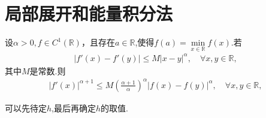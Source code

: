 \documentclass[../../main.tex]{subfiles}%
\begin{document}
\section{局部展开和能量积分法}

\begin{proposition}\label{proposition:g'(x)的Hölder连续相关结论}
设$\alpha>0,f\in C^1(\mathbb{R})$，且存在$a\in \mathbb{R}$,使得$f(a)=\underset{x\in \mathbb{R}}{\min}f\left( x \right)$.若
\begin{align*}
\left| f' \left( x \right) -f' \left( y \right) \right|\leqslant M\left| x-y \right|^{\alpha},\quad \forall x,y\in \mathbb{R} ,
\end{align*}
其中$M$是常数.则
\begin{align}\label{eq::20jrewjf90j23raesfdzcgdfg}
\left| f' \left( x \right) \right|^{\alpha +1}\leqslant M\left( \frac{\alpha +1}{\alpha} \right) ^{\alpha}\left| f\left( x \right) -f\left( y \right) \right|^{\alpha},\quad \forall x,y\in \mathbb{R} ,
\end{align}
\end{proposition}
\begin{note}
可以先待定$h$,最后再确定$h$的取值.
\end{note}
\end{document}
